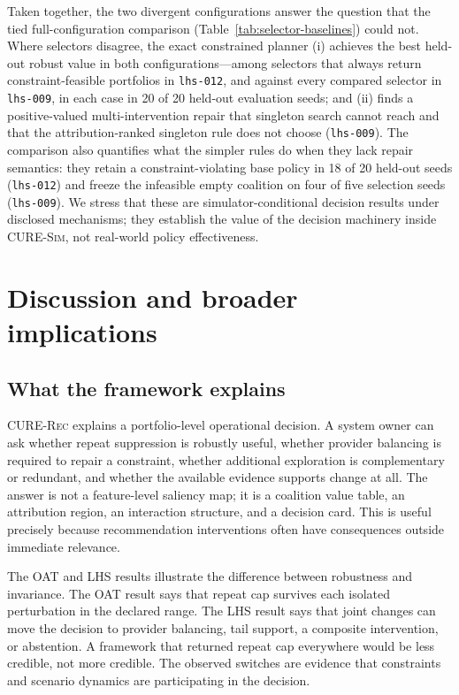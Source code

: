 \documentclass[pdflatex,sn-mathphys-num]{sn-jnl}
\theoremstyle{thmstyleone}
\theoremstyle{thmstyletwo}
\theoremstyle{thmstylethree}
\newcommand{\CURE}{\textsc{CURE-Rec}}
\newcommand{\Sim}{\textsc{CURE-Sim}}
\begin{document}
Taken together, the two divergent configurations answer the question that the tied full-configuration comparison (Table~\ref{tab:selector-baselines}) could not. Where selectors disagree, the exact constrained planner (i) achieves the best held-out robust value in both configurations---among selectors that always return constraint-feasible portfolios in \texttt{lhs-012}, and against every compared selector in \texttt{lhs-009}, in each case in 20 of 20 held-out evaluation seeds; and (ii) finds a positive-valued multi-intervention repair that singleton search cannot reach and that the attribution-ranked singleton rule does not choose (\texttt{lhs-009}). The comparison also quantifies what the simpler rules do when they lack repair semantics: they retain a constraint-violating base policy in 18 of 20 held-out seeds (\texttt{lhs-012}) and freeze the infeasible empty coalition on four of five selection seeds (\texttt{lhs-009}). We stress that these are simulator-conditional decision results under disclosed mechanisms; they establish the value of the decision machinery inside \Sim{}, not real-world policy effectiveness.

\section{Discussion and broader implications}\label{sec:discussion}

\subsection{What the framework explains}

\CURE{} explains a portfolio-level operational decision. A system owner can ask whether repeat suppression is robustly useful, whether provider balancing is required to repair a constraint, whether additional exploration is complementary or redundant, and whether the available evidence supports change at all. The answer is not a feature-level saliency map; it is a coalition value table, an attribution region, an interaction structure, and a decision card. This is useful precisely because recommendation interventions often have consequences outside immediate relevance.

The OAT and LHS results illustrate the difference between robustness and invariance. The OAT result says that repeat cap survives each isolated perturbation in the declared range. The LHS result says that joint changes can move the decision to provider balancing, tail support, a composite intervention, or abstention. A framework that returned repeat cap everywhere would be less credible, not more credible. The observed switches are evidence that constraints and scenario dynamics are participating in the decision.
\end{document}
